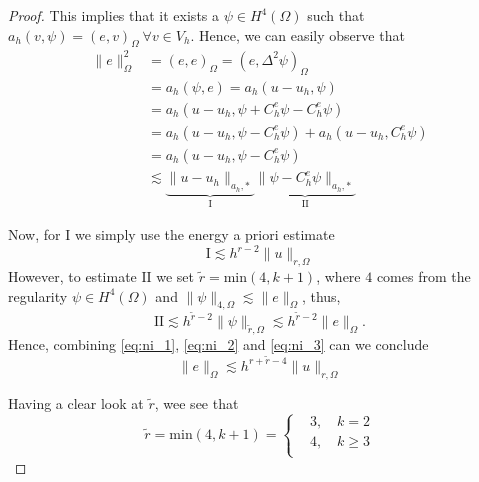 \begin{proof}
        This implies that it exists a $\psi \in H^{4}( \Omega ) $ such that $a_{h}(v, \psi ) = ( e,v)_{\Omega } \ \forall v \in V_{h}  $. Hence, we can easily observe that \begin{equation}
            \label{eq:ni_1}
            \begin{split}
        \| e \|_{ \Omega  }^{ 2 }  & = ( e,e)_\Omega   = ( e, \Delta ^2 \psi )_{\Omega } \\
        &= a_{h}(  \psi, e ) = a_{h}( u-u_h, \psi ) \\
        &= a_{h}( u-u_h, \psi + C^{e}_{h}\psi  - C^{e}_{h}\psi )  \\
        &= a_{h}( u-u_h, \psi   - C^{e}_{h}\psi ) +  a_{h}( u-u_h, C^{e}_{h}\psi )  \\
        &= a_{h}( u-u_h, \psi  - C^{e}_{h}\psi )  \\
        & \lesssim    \underbrace{\|u-u_{h}  \|_{a_{h},*  }^{  }}_{\mathrm{I} }   \underbrace{\| \psi  - C^{e}_{h}\psi \|_{a_{h},*  }^{  }}_{\mathrm{II} }
            \end{split}
        \end{equation}

        Now, for $\mathrm{I} $ we simply use the energy a priori estimate
        \begin{equation}
            \label{eq:ni_2}
            \mathrm{I} \lesssim h^{r-2} \| u \|_{ r,\Omega   }^{  }
        \end{equation}
        However, to estimate $\mathrm{II} $ we set $\widetilde{r} = \mathrm{min} ( 4, k+1)  $, where $4$ comes from the regularity $\psi \in H^{4}( \Omega ) $ and $\| \psi \|_{4,\Omega   }^{  } \lesssim \| e \|_{ \Omega   }^{  }  $, thus,
        \begin{equation}
            \label{eq:ni_3}
            \mathrm{II} \lesssim h^{\widetilde{r} -2} \| \psi \|_{ \widetilde{r},\Omega   }^{  } \lesssim h^{\widetilde{r} -2} \| e \|_{ \Omega   }^{  }.
        \end{equation}
        Hence, combining \eqref{eq:ni_1}, \eqref{eq:ni_2} and \eqref{eq:ni_3}  can we conclude \begin{equation}
            \| e \|_{\Omega   }^{  } \lesssim h^{r+ \widetilde{r} -4} \| u \|_{ r,\Omega   }^{  }
        \end{equation}


        Having a clear look at $\widetilde{r}$, wee see that \begin{equation}
            \widetilde{r} = \mathrm{min}(4, k+1) = \begin{cases}
                & 3, \quad  k=2 \\
                & 4, \quad  k\ge 3 \\
            \end{cases}
        \end{equation}


\end{proof}
